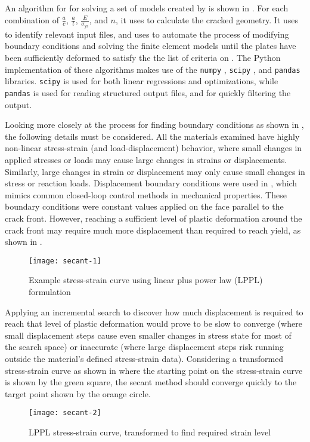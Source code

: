 An algorithm for for solving a set of models created by  is shown in .
For each combination of \(\frac{a}{c}\), \(\frac{a}{t}\), \(\frac{E}{\sigma_{\text{ys}}}\), and \(n\), it uses  to calculate the cracked geometry.
It uses  to identify relevant input files, and uses  to automate the process of modifying boundary conditions and solving the finite element models until the plates have been sufficiently deformed to satisfy the the list of criteria on .
The Python implementation of these algorithms makes use of the \verb|numpy| \cite{numpy}, \verb|scipy| \cite{scipy}, and  \verb|pandas| \cite{mckinney-proc-scipy-2010} libraries.
\verb|scipy| is used for both linear regressions and optimizations, while \verb|pandas| is used for reading structured output files, and for quickly filtering the output.

Looking more closely at the process for finding boundary conditions as shown in , the following details must be considered.
All the materials examined have highly non-linear stress-strain (and load-displacement) behavior, where small changes in applied stresses or loads may cause large changes in strains or displacements.
Similarly, large changes in strain or displacement may only cause small changes in stress or reaction loads.
Displacement boundary conditions were used in \cite{allenwells2014}, which mimics common closed-loop control methods in mechanical properties.
These boundary conditions were constant values applied on the face parallel to the crack front.
However, reaching a sufficient level of plastic deformation around the crack front may require much more displacement than required to reach yield, as shown in .
\begin{figure}[tbp]
\centering
\texttt{[image: secant-1]}
\caption{\label{fig:secant-1}Example stress-strain curve using linear plus power law (LPPL) formulation}
\end{figure}
Applying an incremental search to discover how much displacement is required to reach that level of plastic deformation would prove to be slow to converge (where small displacement steps cause even smaller changes in stress state for most of the search space) or inaccurate (where large displacement steps risk running outside the material's defined stress-strain data).
Considering a transformed stress-strain curve as shown in  where the starting point on the stress-strain curve is shown by the green square, the secant method should converge quickly to the target point shown by the orange circle.
\begin{figure}[tbp]
\centering
\texttt{[image: secant-2]}
\caption{\label{fig:secant-2}LPPL stress-strain curve, transformed to find required strain level}
\end{figure}

